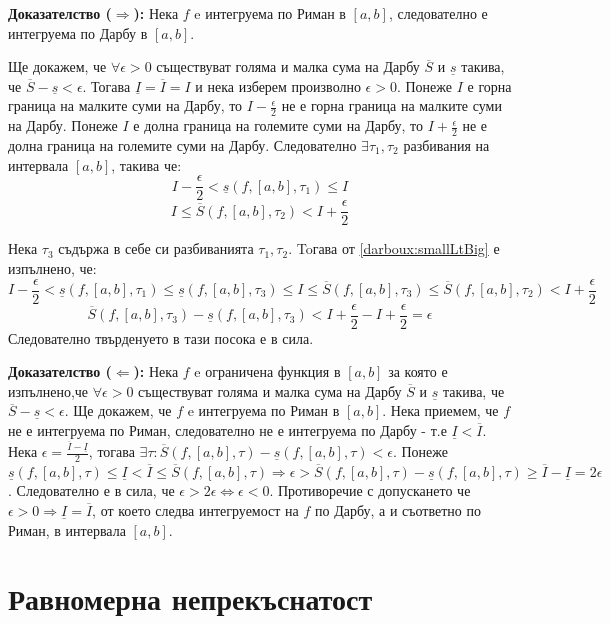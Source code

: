 \documentclass[fleqn,12pt]{article}
\begin{document}
\textbf{Доказателство ($\Longrightarrow$):} Нека $f$ e интегруема по Риман в $[a,b]$, следователно е интегруема по Дарбу в $[a,b]$.

Ще докажем, че $\forall\epsilon > 0$ съществуват голяма и малка сума на Дарбу $\overline{S}$ и $\underline{s}$ такива, че $\overline{S} - \underline{s} < \epsilon$.
Тогава $\underline{I}=\overline{I}=I$ и нека изберем произволно $\epsilon > 0$. Понеже $I$ е горна граница на малките суми на Дарбу, то 
$I - \frac{\epsilon}{2}$ не е горна граница на малките суми на Дарбу. Понеже $I$ е долна граница на големите суми на Дарбу, то $I + \frac{\epsilon}{2}$ не е долна граница на големите суми на Дарбу.
Следователно $\exists \tau_1,\tau_2$ разбивания на интервала $[a,b]$, такива че:
\[ I - \frac{\epsilon}{2} < \underline{s}(f,[a,b],\tau_1) \leq I \]
\[ I \leq \overline{S}(f,[a,b],\tau_2) < I + \frac{\epsilon}{2} \]

Нека $\tau_3$ съдържа в себе си разбиванията $\tau_1,\tau_2$. Toгава от \ref{darboux:smallLtBig} е изпълнено, че:
\[ I - \frac{\epsilon}{2} < \underline{s}(f,[a,b],\tau_1) \leq  \underline{s}(f,[a,b],\tau_3) \leq I \leq \overline{S}(f,[a,b],\tau_3) \leq \overline{S}(f,[a,b],\tau_2) < I + \frac{\epsilon}{2} \]
\[ \overline{S}(f,[a,b],\tau_3) - \underline{s}(f,[a,b],\tau_3) < I + \frac{\epsilon}{2} - I + \frac{\epsilon}{2} = \epsilon \]
Следователно твърденуето в тази посока е в сила.

\textbf{Доказателство ($\Longleftarrow$):}
Нека $f$ e ограничена функция в $[a,b]$ за която е изпълнено,че $\forall\epsilon > 0$ съществуват голяма и малка сума на Дарбу $\overline{S}$ и $\underline{s}$ такива, че $\overline{S} - \underline{s} < \epsilon$.
Ще докажем, че $f$ e интегруема по Риман в $[a,b]$. Нека приемем, че $f$ не е интегруема по Риман, следователно не е интегруема по Дарбу - т.е $\underline{I} < \overline{I}$.
Нека $\epsilon = \frac{\overline{I} - \underline{I}}{2}$, тогава $\exists\tau : \overline{S}(f,[a,b],\tau) - \underline{s}(f,[a,b],\tau) < \epsilon$.
Понеже $\underline{s}(f,[a,b],\tau) \leq \underline{I} < \overline{I} \leq \overline{S}(f,[a,b],\tau) \Longrightarrow \epsilon > \overline{S}(f,[a,b],\tau) - \underline{s}(f,[a,b],\tau) \geq \overline{I} - \underline{I} = 2\epsilon$.
Следователно е в сила, че $\epsilon > 2\epsilon \Leftrightarrow \epsilon < 0$.
Противоречие с допускането че $\epsilon>0 \Longrightarrow \underline{I}=\overline{I}$, от което следва интегруемост на $f$ по Дарбу, а и съответно по Риман, в интервала $[a,b]$.

\section{Равномерна непрекъснатост}
\end{document}
